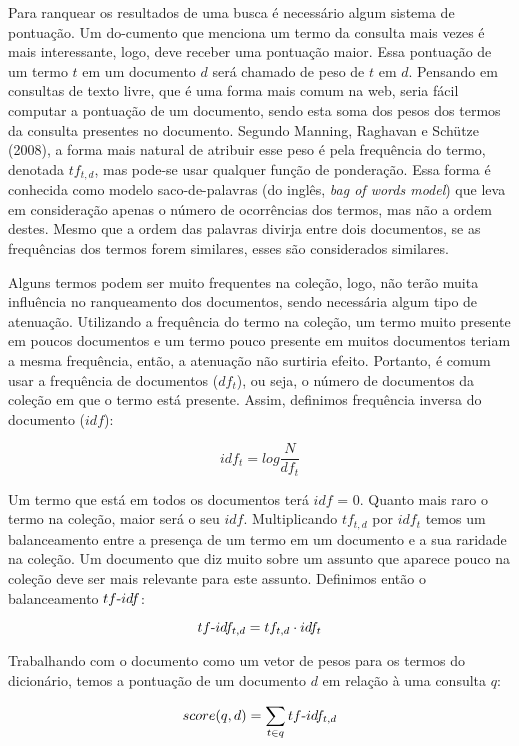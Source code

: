 Para ranquear os resultados de uma busca é necessário algum sistema de pontuação. Um do-cumento que menciona um termo da consulta mais vezes é mais interessante, logo, deve receber uma pontuação maior. Essa pontuação de um termo $t$ em um documento $d$ será chamado de peso de $t$ em $d$. Pensando em consultas de texto livre, que é uma forma mais comum na web, seria fácil computar a pontuação de um documento, sendo esta soma dos pesos dos termos da consulta presentes no documento. Segundo Manning, Raghavan e Schütze (2008), a forma mais natural de atribuir esse peso é pela frequência do termo, denotada $tf_{t,d}$, mas pode-se usar qualquer função de ponderação. Essa forma é conhecida como modelo saco-de-palavras (do inglês, \emph{bag of words model}) que leva em consideração apenas o número de ocorrências dos termos, mas não a ordem destes. Mesmo que a ordem das palavras divirja entre dois documentos, se as frequências dos termos forem similares, esses são considerados similares.

Alguns termos podem ser muito frequentes na coleção, logo, não terão muita influência no ranqueamento dos documentos, sendo necessária algum tipo de atenuação. Utilizando a frequência do termo na coleção, um termo muito presente em poucos documentos e um termo pouco presente em muitos documentos teriam a mesma frequência, então, a atenuação não surtiria efeito. Portanto, é comum usar a frequência de documentos ($df_{t}$), ou seja, o número de documentos da coleção em que o termo está presente. Assim, definimos frequência inversa do documento ($idf$):

$$idf_{t} = log \frac{N}{df_{t}}$$

Um termo que está em todos os documentos terá $idf$ = 0. Quanto mais raro o termo na coleção, maior será o seu $idf$. Multiplicando $tf_{t,d}$ por $idf_{t}$ temos um balanceamento entre a presença de um termo em um documento e a sua raridade na coleção. Um documento que diz muito sobre um assunto que aparece pouco na coleção deve ser mais relevante para este assunto. Definimos então o balanceamento $tf\textnormal{-}idf$:

$$tf\textnormal{-}idf_{t,d} = tf_{t,d} \cdot idf_{t}$$

Trabalhando com o documento como um vetor de pesos para os termos do dicionário, temos a pontuação de um documento $d$ em relação à uma consulta $q$:

\begin{displaymath}
score(q,d) = \sum_{t \in q} tf\textnormal{-}idf_{t,d}
\end{displaymath}

